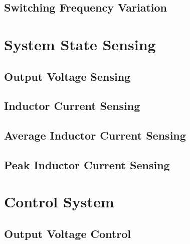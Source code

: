 \subsection*{Switching Frequency Variation}

\section{System State Sensing}\label{S:current_sense_eval}

\subsection{Output Voltage Sensing}

\subsection{Inductor Current Sensing}

\subsection*{Average Inductor Current Sensing}

\subsection*{Peak Inductor Current Sensing}

\section{Control System}\label{S:control_eval}

\subsection*{Output Voltage Control}

